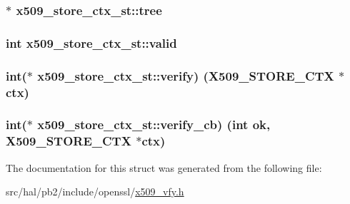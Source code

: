 \subsubsection[{\texorpdfstring{tree}{tree}}]{$\ast$ x509\+\_\+store\+\_\+ctx\+\_\+st\+::tree}\hypertarget{structx509__store__ctx__st_a4738c07151861b6f8836cdac1ab66464}{}\label{structx509__store__ctx__st_a4738c07151861b6f8836cdac1ab66464}
\subsubsection[{\texorpdfstring{valid}{valid}}]{\setlength{\rightskip}{0pt plus 5cm}int x509\+\_\+store\+\_\+ctx\+\_\+st\+::valid}\hypertarget{structx509__store__ctx__st_ab8b4e8f74c47a32e46099ff8c4b66b7f}{}\label{structx509__store__ctx__st_ab8b4e8f74c47a32e46099ff8c4b66b7f}
\subsubsection[{\texorpdfstring{verify}{verify}}]{\setlength{\rightskip}{0pt plus 5cm}int($\ast$ x509\+\_\+store\+\_\+ctx\+\_\+st\+::verify) ({\bf X509\+\_\+\+S\+T\+O\+R\+E\+\_\+\+C\+TX} $\ast${\bf ctx})}\hypertarget{structx509__store__ctx__st_a40f028b2c848dc8df554ab89ac562fd1}{}\label{structx509__store__ctx__st_a40f028b2c848dc8df554ab89ac562fd1}
\subsubsection[{\texorpdfstring{verify\+\_\+cb}{verify_cb}}]{\setlength{\rightskip}{0pt plus 5cm}int($\ast$ x509\+\_\+store\+\_\+ctx\+\_\+st\+::verify\+\_\+cb) (int ok, {\bf X509\+\_\+\+S\+T\+O\+R\+E\+\_\+\+C\+TX} $\ast${\bf ctx})}\hypertarget{structx509__store__ctx__st_a07d959e3a0cb959ec7c39bd7b8ee76eb}{}\label{structx509__store__ctx__st_a07d959e3a0cb959ec7c39bd7b8ee76eb}


The documentation for this struct was generated from the following file\+:\begin{DoxyCompactItemize}
\item 
src/hal/pb2/include/openssl/\hyperlink{x509__vfy_8h}{x509\+\_\+vfy.\+h}\end{DoxyCompactItemize}
